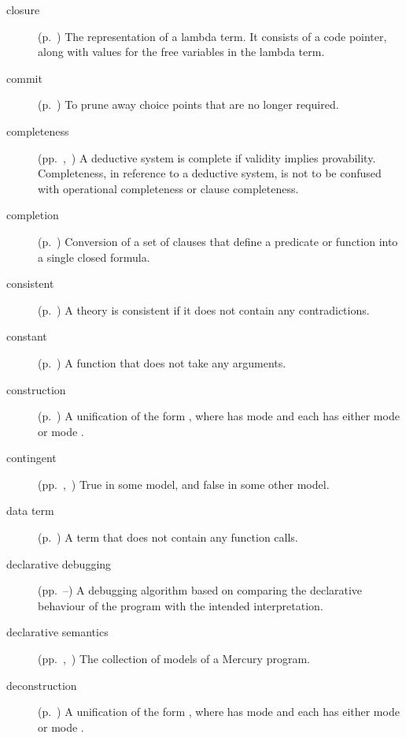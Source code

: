\begin{description}
\item[closure]
(p.~\pageref{gi:closure})
The representation of a lambda term.
It consists of a code pointer,
along with values for the free variables
in the lambda term.

\item[commit]
(p.~\pageref{gi:commit})
To prune away choice points that are no longer required.

\item[completeness]
(pp.~\pageref{thm:completeness},~\pageref{gi:completeness2})
A deductive system is complete if validity implies provability.
Completeness, in reference to a deductive system,
is not to be confused with operational completeness or clause completeness.

\item[completion]
(p.~\pageref{sec:completion})
Conversion of a set of clauses that define a predicate or function
into a single closed formula.

\item[consistent]
(p.~\pageref{gi:consistent})
A theory is consistent if it does not contain any contradictions.

\item[constant]
(p.~\pageref{gi:constant})
A function that does not take any arguments.

\item[construction]
(p.~\pageref{gi:construction})
A unification of the form ,
where  has mode 
and each  has either mode 
or mode .

\item[contingent]
(pp.~\pageref{gi:contingent},~\pageref{gi:contingent2})
True in some model, and false in some other model.

\item[data term]
(p.~\pageref{gi:data-term})
A term that does not contain any function calls.

\item[declarative debugging]
(pp.~\pageref{sec:decl-debug}--\pageref{end:decl-debug})
A debugging algorithm based on
comparing the declarative behaviour of the program
with the intended interpretation.

\item[declarative semantics]
(pp.~\pageref{sec:by-example},~\pageref{def:declarative-semantics})
The collection of models of a Mercury program.

\item[deconstruction]
(p.~\pageref{gi:deconstruction})
A unification of the form ,
where  has mode 
and each  has either mode 
or mode .


\end{description}
